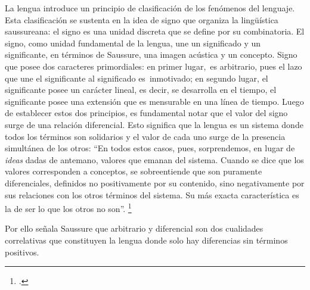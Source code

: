 La lengua introduce un principio de clasificación de los fenómenos del lenguaje. Esta clasificación se sustenta en la idea de signo que organiza la lingüística saussureana: el signo es una unidad discreta que se define por su combinatoria. El signo, como  \linebreak unidad fundamental de la lengua, une un significado y un significante, en términos de Saussure, una imagen acústica y un concepto. Signo que posee dos caracteres primordiales: en primer lugar,~es arbitrario, pues el lazo que une el significante al significado  \linebreak es~inmotivado; en segundo lugar, el significante posee un carácter lineal, es decir, se desarrolla en el tiempo, el significante posee una extensión que es mensurable en una línea de tiempo. Luego de establecer estos dos principios, es fundamental notar que el valor del signo surge de una relación diferencial. Esto significa que la lengua es un sistema donde todos los términos son solidarios y el valor de cada uno surge de la presencia simultánea de los otros: \enquote{En todos estos casos, pues, sorprendemos, en lugar de \emph{ideas} dadas de antemano, valores que emanan del sistema. Cuando se dice que los valores corresponden a conceptos, se sobreentiende que son puramente diferenciales, definidos no positivamente por su contenido, sino negativamente por sus relaciones con los otros términos del sistema. Su más exacta característica es la de ser lo que los otros no son}. \footcite[]{@6970-SAUSSURE1945}

Por ello señala Saussure que arbitrario y diferencial son dos cualidades correlativas que constituyen la lengua donde solo hay diferencias sin términos positivos.

